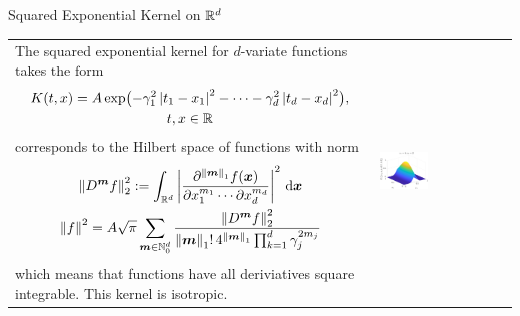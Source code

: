 \documentclass[10pt,compress,xcolor={usenames,dvipsnames},aspectratio=169]{beamer}
\begin{document}
\begin{frame}{Squared Exponential Kernel on $\reals^d$}
	\begin{tabular}{m{}m{}}
		The squared exponential kernel for $d$-variate functions takes the form 
		\begin{multline*}
			K(t,x) = A \exp\bigl(-\gamma_1^2\abs{t_1-x_1}^2 - \cdots - \gamma_d^2\abs{t_d-x_d}^2 \bigr) , \\
			t, x \in \reals
		\end{multline*}
		corresponds to the Hilbert space of functions with norm
		\begin{gather*}
			\norm[2]{D^{\vm} f}^2 := \int_{\reals^d} \abs{\frac{\partial^{\norm[1]{\vm}}f(\vx)}{\partial x_1^{m_1} \cdots \partial x_d^{m_d}}}^2 \, \dif \vx \\
			\norm{f}^2 =  A\sqrt{\pi}  \sum_{\vm \in \natzero^d} \frac{\norm[2]{D^{\vm} f}^2}{\norm[1]{\vm}! \, 4^{\norm[1]{\vm}} \prod_{k=1}^d \gamma_j^{2m_j}}
		\end{gather*}
		which means that functions have all deriviatives square integrable.  This kernel is \alert{isotropic}.
		&
		\includegraphics[width=0.38\textwidth]{RK2-sqexpker.eps}
	\end{tabular}
	
\end{frame}
\end{document}
